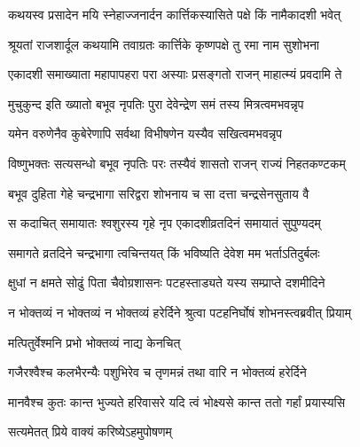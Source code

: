 \label{sec:padma-karttika-krishna-rama}

\ganapatyadiDhyanam
\padmaPuranam



\twolineshloka
{कथयस्व प्रसादेन मयि स्नेहाज्जनार्दन}
{कार्त्तिकस्यासिते पक्षे किं नामैकादशी भवेत्}%


\twolineshloka
{श्रूयतां राजशार्दूल कथयामि तवाग्रतः}
{कार्त्तिके कृष्णपक्षे तु रमा नाम सुशोभना}%

\twolineshloka
{एकादशी समाख्याता महापापहरा परा}
{अस्याः प्रसङ्गतो राजन् माहात्म्यं प्रवदामि ते}%

\twolineshloka
{मुचुकुन्द इति ख्यातो बभूव नृपतिः पुरा}
{देवेन्द्रेण समं तस्य मित्रत्वमभवन्नृप}%

\twolineshloka
{यमेन वरुणेनैव कुबेरेणापि सर्वथा}
{विभीषणेन यस्यैव सखित्वमभवन्नृप}%

\twolineshloka
{विष्णुभक्तः सत्यसन्धो बभूव नृपतिः परः}
{तस्यैवं शासतो राजन् राज्यं निहतकण्टकम्}%

\twolineshloka
{बभूव दुहिता गेहे चन्द्रभागा सरिद्वरा}
{शोभनाय च सा दत्ता चन्द्रसेनसुताय वै}%

\twolineshloka
{स कदाचित् समायातः श्वशुरस्य गृहे नृप}
{एकादशीव्रतदिनं समायातं सुपुण्यदम् }%

\twolineshloka
{समागते व्रतदिने चन्द्रभागा त्वचिन्तयत्}
{किं भविष्यति देवेश मम भर्ताऽतिदुर्बलः}%

\twolineshloka
{क्षुधां न क्षमते सोढुं पिता चैवोग्रशासनः}
{पटहस्ताड्यते यस्य सम्प्राप्ते दशमीदिने}%

\twolineshloka
{न भोक्तव्यं न भोक्तव्यं न भोक्तव्यं हरेर्दिने}
{श्रुत्वा पटहनिर्घोषं शोभनस्त्वब्रवीत् प्रियाम्}%

\onelineshloka
{मत्पितुर्वेश्मनि प्रभो भोक्तव्यं नाद्य केनचित्}%

\twolineshloka
{गजैरश्वैश्च कलभैरन्यैः पशुभिरेव  च}
{तृणमन्नं तथा वारि न भोक्तव्यं हरेर्दिने}%

\twolineshloka
{मानवैश्च कुतः कान्त भुज्यते हरिवासरे}
{यदि त्वं भोक्ष्यसे कान्त ततो गर्हां प्रयास्यसि}%

\onelineshloka
{सत्यमेतत् प्रिये वाक्यं करिष्येऽहमुपोषणम्}%

